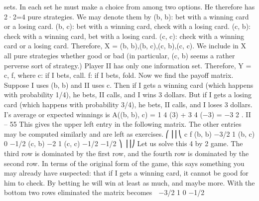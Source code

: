 sets. In each set he must make a choice from among two options. He therefore has 2·2=4
pure strategies. We may denote them by
(b, b): bet with a winning card or a losing card.
(b, c): bet with a winning card, check with a losing card.
(c, b): check with a winning card, bet with a losing card.
(c, c): check with a winning card or a losing card.
Therefore, X = {(b, b),(b, c),(c, b),(c, c)}. We include in X all pure strategies whether
good or bad (in particular, (c, b) seems a rather perverse sort of strategy.)
Player II has only one information set. Therefore, Y = {c, f}, where
c: if I bets, call.
f: if I bets, fold.
Now we find the payoff matrix. Suppose I uses (b, b) and II uses c. Then if I gets a
winning card (which happens with probability 1/4), he bets, II calls, and I wins 3 dollars.
But if I gets a losing card (which happens with probability 3/4), he bets, II calls, and I
loses 3 dollars. I’s average or expected winnings is
A((b, b), c) = 1
4
(3) + 3
4
(−3) = −3
2
.
II – 55
This gives the upper left entry in the following matrix. The other entries may be computed
similarly and are left as exercises.
⎛
⎜⎜⎝
c f
(b, b) −3/2 1
(b, c) 0 −1/2
(c, b) −2 1
(c, c) −1/2 −1/2
⎞
⎟⎟⎠
Let us solve this 4 by 2 game. The third row is dominated by the first row, and the
fourth row is dominated by the second row. In terms of the original form of the game, this
says something you may already have suspected: that if I gets a winning card, it cannot
be good for him to check. By betting he will win at least as much, and maybe more. With
the bottom two rows eliminated the matrix becomes  −3/2 1
0 −1/2

